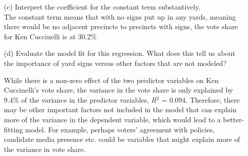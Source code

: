 \documentclass[12pt,letterpaper]{article}
\begin{document}
\begin{enumerate}
	\vspace{0.5cm}
	\item [(c)] Interpret the coefficient for the constant term substantively.
	\vspace{0.5cm} \\
	\noindent The constant term means that with no signs put up in any yards, meaning there would be no adjacent precincts to precincts with signs, the vote share for Ken Cuccinelli is at 30.2\%
	
	\item [(d)] Evaluate the model fit for this regression.  What does this	tell us about the importance of yard signs versus other factors that are not modeled?
	\vspace{0.5cm}
	
	\noindent While there is a non-zero effect of the two predictor variables on Ken Cuccinelli's vote share, the variance in the vote share is only explained by 9.4\% of the variance in the predictor variables, \textit{R}$^2$ = 0.094. Therefore, there may be other important factors not included in the model that can explain more of the variance in the dependent variable, which would lead to a better-fitting model. For example, perhaps voters' agreement with policies, candidate media presence etc. could be variables that might explain more of the variance in vote share.  
	
\end{enumerate}  
\end{document}

